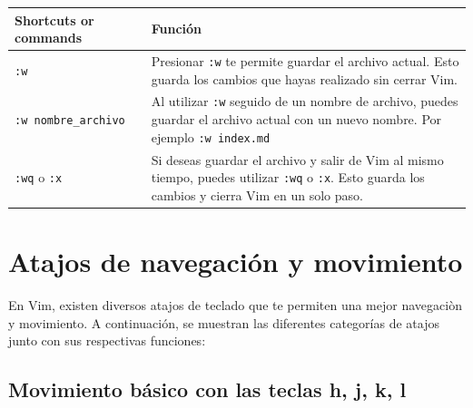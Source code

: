 \documentclass[
  doc,
  floatsintext,
  longtable,
  a4paper,
  nolmodern,
  notxfonts,
  notimes,
  12pt,
  colorlinks=true,linkcolor=blue,citecolor=blue,urlcolor=blue]{apa7}
\newcounter{none} %
\begin{document}
{\def\LTcaptype{none} %
\begin{longtable}[]{@{}
  >{\raggedright\arraybackslash}p{}
  >{\raggedright\arraybackslash}p{}@{}}
\toprule\noalign{}
\begin{minipage}[b]{\linewidth}\raggedright
Shortcuts or commands
\end{minipage} & \begin{minipage}[b]{\linewidth}\raggedright
Función
\end{minipage} \\
\midrule\noalign{}
\endhead
\bottomrule\noalign{}
\endlastfoot
\texttt{:w} & Presionar \texttt{:w} te permite guardar el archivo
actual. Esto guarda los cambios que hayas realizado sin cerrar Vim. \\
\texttt{:w\ nombre\_archivo} & Al utilizar \texttt{:w} seguido de un
nombre de archivo, puedes guardar el archivo actual con un nuevo nombre.
Por ejemplo \texttt{:w\ index.md} \\
\texttt{:wq} o \texttt{:x} & Si deseas guardar el archivo y salir de Vim
al mismo tiempo, puedes utilizar \texttt{:wq} o \texttt{:x}. Esto guarda
los cambios y cierra Vim en un solo paso. \\
\end{longtable}
}

\section{Atajos de navegación y
movimiento}\label{atajos-de-navegaciuxf3n-y-movimiento}

En Vim, existen diversos atajos de teclado que te permiten una mejor
navegaciòn y movimiento. A continuación, se muestran las diferentes
categorías de atajos junto con sus respectivas funciones:

\subsection{Movimiento básico con las teclas h, j, k,
l}\label{movimiento-buxe1sico-con-las-teclas-h-j-k-l}
\end{document}
